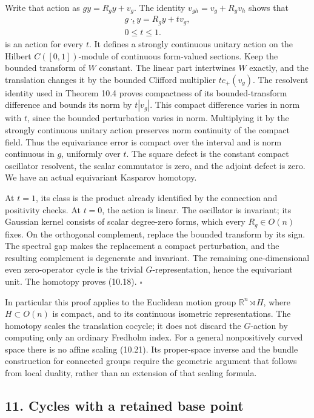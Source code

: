 \documentclass[
  11pt,
]{article}
\begin{document}
Write that action as \(g y=R_g y+v_g\). The identity
\(v_{gh}=v_g+R_gv_h\) shows that \[
\begin{gathered}
g\cdot_t y=R_g y+t v_g,\\
0\leq t\leq1.
\end{gathered}
\tag{10.21}
\] is an action for every \(t\). It defines a strongly continuous
unitary action on the Hilbert \(C([0,1])\)-module of continuous
form-valued sections. Keep the bounded transform of \(W\) constant. The
linear part intertwines \(W\) exactly, and the translation changes it by
the bounded Clifford multiplier \(t c_+(v_g)\). The resolvent identity
used in Theorem 10.4 proves compactness of its bounded-transform
difference and bounds its norm by \(t|v_g|\). This compact difference
varies in norm with \(t\), since the bounded perturbation varies in
norm. Multiplying it by the strongly continuous unitary action preserves
norm continuity of the compact field. Thus the equivariance error is
compact over the interval and is norm continuous in \(g\), uniformly
over \(t\). The square defect is the constant compact oscillator
resolvent, the scalar commutator is zero, and the adjoint defect is
zero. We have an actual equivariant Kasparov homotopy.

At \(t=1\), its class is the product already identified by the
connection and positivity checks. At \(t=0\), the action is linear. The
oscillator is invariant; its Gaussian kernel consists of scalar
degree-zero forms, which every \(R_g\in O(n)\) fixes. On the orthogonal
complement, replace the bounded transform by its sign. The spectral gap
makes the replacement a compact perturbation, and the resulting
complement is degenerate and invariant. The remaining one-dimensional
even zero-operator cycle is the trivial \(G\)-representation, hence the
equivariant unit. The homotopy proves (10.18). \(\square\)

In particular this proof applies to the Euclidean motion group
\(\mathbb R^n\rtimes H\), where \(H\subset O(n)\) is compact, and to its
continuous isometric representations. The homotopy scales the
translation cocycle; it does not discard the \(G\)-action by computing
only an ordinary Fredholm index. For a general nonpositively curved
space there is no affine scaling (10.21). Its proper-space inverse and
the bundle construction for connected groups require the geometric
argument that follows from local duality, rather than an extension of
that scaling formula.

\subsection{11. Cycles with a retained base
point}\label{cycles-with-a-retained-base-point}
\end{document}
